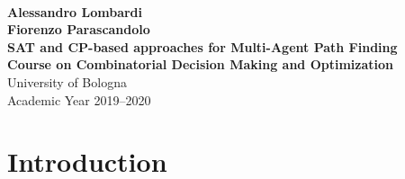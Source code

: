 \documentclass[12pt, a4paper, hidelinks]{article}
\numberwithin{equation}{section}
\begin{document}
\begin{titlepage}
\begin{center}
\hspace{0pt}\\
\vspace{4cm}
{\large\bfseries Alessandro Lombardi}\\[5pt]
{\large\bfseries Fiorenzo Parascandolo}\\
\vspace{3cm}
{\LARGE\bfseries SAT and CP-based approaches for Multi-Agent Path Finding}\\
\vspace{0.8cm}
{\Large\bfseries Course on Combinatorial Decision Making and Optimization}\\[10pt]
\vspace{0.8cm}
\large University of Bologna\\
\large Academic Year 2019--2020
\vfill
\begin{abstract}
Multi-Agent Path Finding (MAPF) is a problem with practical implications in several fields: from robotics and self-driving cars to transportation and logistics.
The task is to find non-conflicting paths for a set of agents given their starting positions and destinations, usually minimizing a cost function.
There are many variations on the classical problem and many approaches have been proposed.
In this work we will focus on SAT and CP-based approaches following the paper of R. Bart\'{a}k, J. {\v S}vancara and M. Vlk, ``A Scheduling-Based Approach to Multi-Agent Path Finding with Weighted and Capacitated Arcs'', published in Proceedings of the 17th International Conference on Autonomous Agents and MultiAgent Systems~\cite{10.5555/3237383.3237494}.
As the authors suggest, this type of problem lends itself particularly well to be formalized using a compact set of constraints and we found interesting to developed as a project for our Combinatorial Decision Making and Optimization course.
\end{abstract}
\end{center}
\end{titlepage}

\newpage

\section*{Introduction}\label{sec:introduction}
\end{document}
